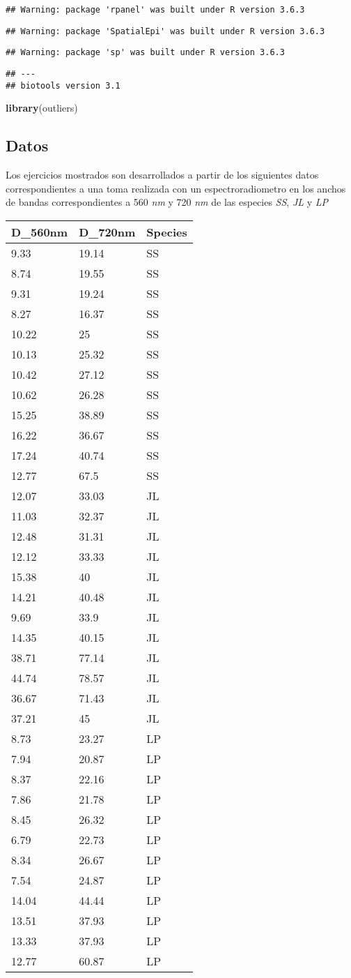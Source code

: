 \documentclass[
]{article}
\newenvironment{Shaded}{\begin{snugshade}}{\end{snugshade}}
\newcommand{\KeywordTok}[1]{\textcolor[rgb]{0.13,0.29,0.53}{\textbf{#1}}}
\newcommand{\NormalTok}[1]{#1}
\begin{document}
\begin{verbatim}
## Warning: package 'rpanel' was built under R version 3.6.3
\end{verbatim}

\begin{verbatim}
## Warning: package 'SpatialEpi' was built under R version 3.6.3
\end{verbatim}

\begin{verbatim}
## Warning: package 'sp' was built under R version 3.6.3
\end{verbatim}

\begin{verbatim}
## ---
## biotools version 3.1
\end{verbatim}

\begin{Shaded}
\begin{Highlighting}[]
\KeywordTok{library}\NormalTok{(outliers)}
\end{Highlighting}
\end{Shaded}

\hypertarget{datos}{%
\subsection{Datos}\label{datos}}

Los ejercicios mostrados son desarrollados a partir de los siguientes
datos correspondientes a una toma realizada con un espectroradiometro en
los anchos de bandas correspondientes a 560 \emph{nm} y 720 \emph{nm} de
las especies \emph{SS}, \emph{JL} y \emph{LP}

\begin{longtable}[]{@{}lll@{}}
\toprule
D\_560nm & D\_720nm & Species\tabularnewline
\midrule
\endhead
9.33 & 19.14 & SS\tabularnewline
8.74 & 19.55 & SS\tabularnewline
9.31 & 19.24 & SS\tabularnewline
8.27 & 16.37 & SS\tabularnewline
10.22 & 25 & SS\tabularnewline
10.13 & 25.32 & SS\tabularnewline
10.42 & 27.12 & SS\tabularnewline
10.62 & 26.28 & SS\tabularnewline
15.25 & 38.89 & SS\tabularnewline
16.22 & 36.67 & SS\tabularnewline
17.24 & 40.74 & SS\tabularnewline
12.77 & 67.5 & SS\tabularnewline
12.07 & 33.03 & JL\tabularnewline
11.03 & 32.37 & JL\tabularnewline
12.48 & 31.31 & JL\tabularnewline
12.12 & 33.33 & JL\tabularnewline
15.38 & 40 & JL\tabularnewline
14.21 & 40.48 & JL\tabularnewline
9.69 & 33.9 & JL\tabularnewline
14.35 & 40.15 & JL\tabularnewline
38.71 & 77.14 & JL\tabularnewline
44.74 & 78.57 & JL\tabularnewline
36.67 & 71.43 & JL\tabularnewline
37.21 & 45 & JL\tabularnewline
8.73 & 23.27 & LP\tabularnewline
7.94 & 20.87 & LP\tabularnewline
8.37 & 22.16 & LP\tabularnewline
7.86 & 21.78 & LP\tabularnewline
8.45 & 26.32 & LP\tabularnewline
6.79 & 22.73 & LP\tabularnewline
8.34 & 26.67 & LP\tabularnewline
7.54 & 24.87 & LP\tabularnewline
14.04 & 44.44 & LP\tabularnewline
13.51 & 37.93 & LP\tabularnewline
13.33 & 37.93 & LP\tabularnewline
12.77 & 60.87 & LP\tabularnewline
\bottomrule
\end{longtable}
\end{document}
